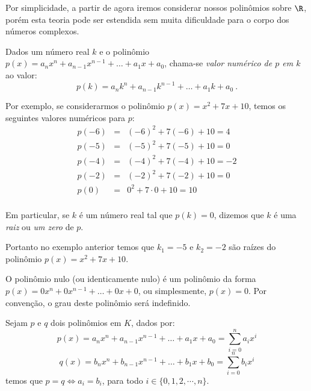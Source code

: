  Por simplicidade, a partir de agora iremos considerar nossos polinômios sobre $\R$, porém esta teoria pode ser estendida sem muita dificuldade para o corpo dos números complexos.

 \begin{defi}
 Dados um número real $k$ e o polinômio $p(x)= a_nx^n + a_{n-1}x^{n-1}+ \ldots + a_1x+ a_0$, chama-se \emph{valor numérico de $p$ em $k$} ao valor:
\begin{equation}
p(k)= a_nk^n + a_{n-1}k^{n-1}+ \ldots + a_1k+ a_0 \ .
\end{equation}
 \end{defi}

\begin{exem}
Por exemplo, se considerarmos o polinômio $p(x)= x^2 + 7x+10$, temos os seguintes valores numéricos para $p$:
\begin{eqnarray*}
p(-6)&=& (-6)^2 + 7(-6) +10= 4\\
p(-5)&=& (-5)^2 + 7(-5) +10= 0\\
p(-4)&=& (-4)^2 + 7(-4) +10= -2\\
p(-2)&=& (-2)^2 + 7(-2) +10= 0\\
p(0)&=& 0^2 + 7 \cdot 0 +10= 10\\
\end{eqnarray*}
\end{exem}

 \begin{defi}
 Em particular, se $k$ é um número real tal que $p(k)= 0$, dizemos que $k$ é uma \emph{raiz} ou \emph{um zero} de $p$.
 \end{defi}

 \begin{exem}
 Portanto no exemplo anterior temos que $k_1= -5$ e $k_2=-2$ são raízes do polinômio $p(x)= x^2 + 7x+10$.
 \end{exem}

  \begin{defi}
  O polinômio nulo (ou identicamente nulo) é um polinômio da forma $p(x)= 0x^n +0x^{n-1}+ \ldots + 0x+ 0$, ou simplesmente, $p(x)= 0$. Por convenção, o grau deste polinômio será indefinido.
 \end{defi}


  \begin{teo}
  Sejam $p$ e $q$ dois polinômios em $K$, dados por:
\begin{equation}
p(x)= a_nx^n + a_{n-1}x^{n-1}+ \ldots + a_1x+ a_0= \sum_{i=0}^{n} a_ix^i
\end{equation}
\begin{equation}
q(x)= b_nx^n + b_{n-1}x^{n-1}+ \ldots + b_1x+ b_0= \sum_{i=0}^{n} b_ix^i
\end{equation}
  temos que $p=q \Leftrightarrow a_i= b_i$, para todo $i \in \{0, 1, 2, \cdots, n\}$.
 \end{teo}

